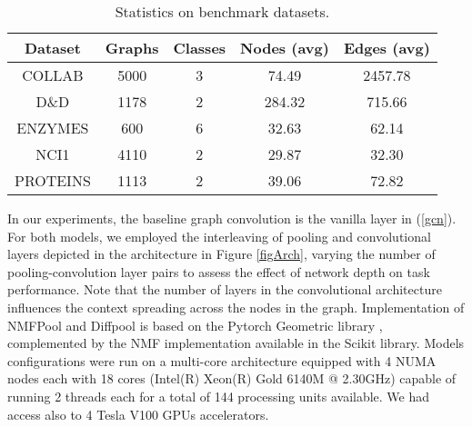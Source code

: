 \documentclass[runningheads]{llncs}
\begin{document}
\begin{table}
\centering
\caption{Statistics on benchmark datasets.}\label{table-datasets}
\begin{tabular}{ccccc} \toprule[1.5pt]
    {\bfseries{Dataset}} & {\bfseries{Graphs}} & {\bfseries{Classes}} & {\bfseries{Nodes (avg)}} & {\bfseries{Edges (avg)}} \\ \midrule
    {COLLAB} & 5000 & 3 & 74.49 & 2457.78 \\
    {D\&D} & 1178 & 2 & 284.32 & 715.66 \\
    {ENZYMES} & 600  & 6 & 32.63 & 62.14   \\
    {NCI1} & 4110 & 2 & 29.87 & 32.30 \\
    {PROTEINS} & 	1113 & 2 & 39.06 & 72.82 \\ \bottomrule[1.5pt]

\end{tabular}
\end{table}

In our experiments, the baseline graph convolution is the vanilla layer in (\ref{gcn}). For both models, we employed the interleaving of pooling and convolutional layers depicted in the architecture in Figure \ref{figArch}, varying the number of pooling-convolution layer pairs to assess the effect of network depth on task performance. Note that the number of layers in the convolutional architecture influences the context spreading across the nodes in the graph. Implementation of NMFPool and Diffpool is based on the Pytorch Geometric library \cite{DBLP:journals/corr/abs-1903-02428}, complemented by the NMF implementation available in the Scikit library. Models configurations were run on a multi-core architecture equipped with 4 NUMA nodes each with 18 cores (Intel(R) Xeon(R) Gold 6140M @ 2.30GHz) capable of running 2 threads each for a total of 144 processing units available. We had access also to 4 Tesla V100 GPUs accelerators.
\end{document}
